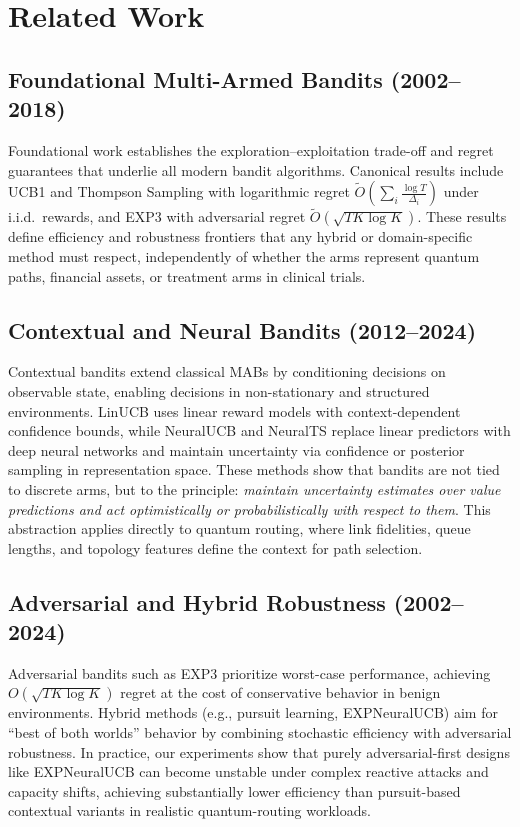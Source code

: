 \documentclass[10pt,twocolumn,journal]{IEEEtran}
\begin{document}
\section{Related Work}
\label{sec:related}

\subsection{Foundational Multi-Armed Bandits (2002--2018)}

Foundational work establishes the exploration--exploitation trade-off and regret guarantees that underlie all modern bandit algorithms. Canonical results include UCB1 and Thompson Sampling with logarithmic regret $\tilde{O}\!\left(\sum_i \frac{\log T}{\Delta_i}\right)$ under i.i.d.\ rewards, and EXP3 with adversarial regret $\tilde{O}(\sqrt{T K \log K})$. These results define efficiency and robustness frontiers that any hybrid or domain-specific method must respect, independently of whether the arms represent quantum paths, financial assets, or treatment arms in clinical trials.

\subsection{Contextual and Neural Bandits (2012--2024)}

Contextual bandits extend classical MABs by conditioning decisions on observable state, enabling decisions in non-stationary and structured environments. LinUCB uses linear reward models with context-dependent confidence bounds, while NeuralUCB and NeuralTS replace linear predictors with deep neural networks and maintain uncertainty via confidence or posterior sampling in representation space. These methods show that bandits are not tied to discrete arms, but to the principle: \emph{maintain uncertainty estimates over value predictions and act optimistically or probabilistically with respect to them}. This abstraction applies directly to quantum routing, where link fidelities, queue lengths, and topology features define the context for path selection.

\subsection{Adversarial and Hybrid Robustness (2002--2024)}

Adversarial bandits such as EXP3 prioritize worst-case performance, achieving $O(\sqrt{T K \log K})$ regret at the cost of conservative behavior in benign environments. Hybrid methods (e.g., pursuit learning, EXPNeuralUCB) aim for ``best of both worlds'' behavior by combining stochastic efficiency with adversarial robustness. In practice, our experiments show that purely adversarial-first designs like EXPNeuralUCB can become unstable under complex reactive attacks and capacity shifts, achieving substantially lower efficiency than pursuit-based contextual variants in realistic quantum-routing workloads.
\end{document}
